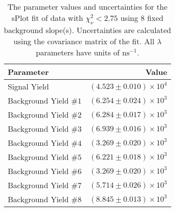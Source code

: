 
\begin{table}
    \begin{center}
        \begin{tabular}{lr}\toprule
            Parameter & Value \\\midrule
            Signal Yield & $(4.523 \pm 0.010) \times 10^{4}$ \\
            Background Yield $\#1$ & $(6.254 \pm 0.024) \times 10^{3}$ \\
            Background Yield $\#2$ & $(6.284 \pm 0.017) \times 10^{3}$ \\
            Background Yield $\#3$ & $(6.939 \pm 0.016) \times 10^{3}$ \\
            Background Yield $\#4$ & $(3.269 \pm 0.020) \times 10^{3}$ \\
            Background Yield $\#5$ & $(6.221 \pm 0.018) \times 10^{3}$ \\
            Background Yield $\#6$ & $(3.269 \pm 0.020) \times 10^{3}$ \\
            Background Yield $\#7$ & $(5.714 \pm 0.026) \times 10^{3}$ \\
            Background Yield $\#8$ & $(8.845 \pm 0.013) \times 10^{3}$ \\\bottomrule
        \end{tabular}
        \caption{The parameter values and uncertainties for the sPlot fit of data with $\chi^2_\nu < 2.75$ using 8 fixed background slope(s). Uncertainties are calculated using the covariance matrix of the fit. All $\lambda$ parameters have units of $\si{\nano\second}^{-1}$.}
    \end{center}
\end{table}
